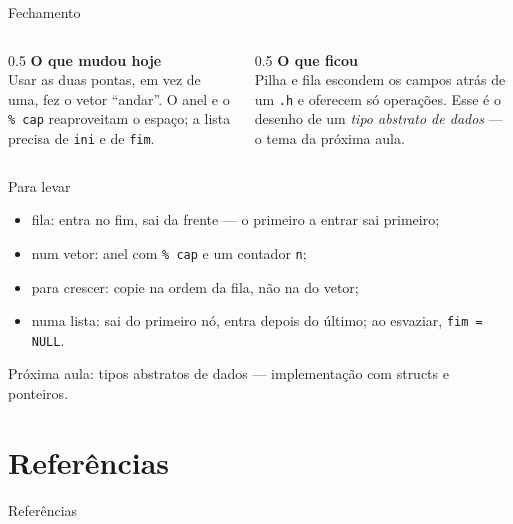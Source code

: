 \documentclass[aspectratio=169]{beamer}
\begin{document}
\begin{frame}{Fechamento}
  \begin{columns}[T]
    \begin{column}{0.5\textwidth}
      \textbf{O que mudou hoje}\\[0.3em]
      \small Usar as duas pontas, em vez de uma, fez o vetor ``andar''. O
      anel e o \texttt{\% cap} reaproveitam o espaço; a lista precisa de
      \texttt{ini} e de \texttt{fim}.
    \end{column}
    \begin{column}{0.5\textwidth}
      \textbf{O que ficou}\\[0.3em]
      \small Pilha e fila escondem os campos atrás de um \texttt{.h} e
      oferecem só operações. Esse é o desenho de um \emph{tipo abstrato de
      dados} --- o tema da próxima aula.
    \end{column}
  \end{columns}
  \begin{block}{Para levar}
    \begin{itemize}
      \small
      \item fila: entra no fim, sai da frente --- o primeiro a entrar sai
        primeiro;
      \item num vetor: anel com \texttt{\% cap} e um contador \texttt{n};
      \item para crescer: copie na ordem da fila, não na do vetor;
      \item numa lista: sai do primeiro nó, entra depois do último; ao
        esvaziar, \texttt{fim = NULL}.
    \end{itemize}
  \end{block}
  \small\textcolor{UFSGray}{Próxima aula: tipos abstratos de dados ---
  implementação com structs e ponteiros.}
\end{frame}

\section*{Referências}
\begin{frame}[allowframebreaks]{Referências}
  \nocite{*}
  
  
\end{frame}
\end{document}
